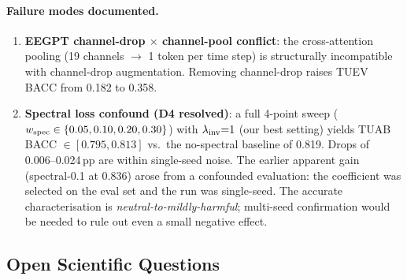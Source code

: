 \documentclass[11pt,a4paper]{article}
\begin{document}
\paragraph{Failure modes documented.}
\begin{enumerate}[noitemsep]
  \item \textbf{EEGPT channel-drop $\times$ channel-pool conflict}: the cross-attention
    pooling (19 channels $\to$ 1 token per time step) is structurally incompatible with
    channel-drop augmentation.  Removing channel-drop raises TUEV BACC from 0.182 to 0.358.
  \item \textbf{Spectral loss confound (D4 resolved)}:
    a full 4-point sweep ($w_{\rm spec} \in \{0.05, 0.10, 0.20, 0.30\}$) with
    $\lambda_{\rm inv}{=}1$ (our best setting) yields TUAB BACC $\in [0.795, 0.813]$
    vs.\ the no-spectral baseline of 0.819.
    Drops of 0.006--0.024\,pp are within single-seed noise.
    The earlier apparent gain (spectral-0.1 at 0.836) arose from a confounded evaluation:
    the coefficient was selected on the eval set and the run was single-seed.
    The accurate characterisation is \emph{neutral-to-mildly-harmful}; multi-seed
    confirmation would be needed to rule out even a small negative effect.
\end{enumerate}

\subsection{Open Scientific Questions}
\end{document}
